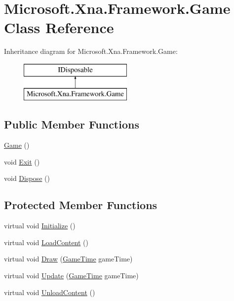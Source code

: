 \hypertarget{class_microsoft_1_1_xna_1_1_framework_1_1_game}{}\section{Microsoft.\+Xna.\+Framework.\+Game Class Reference}
\label{class_microsoft_1_1_xna_1_1_framework_1_1_game}
Inheritance diagram for Microsoft.\+Xna.\+Framework.\+Game\+:\begin{figure}[H]
\begin{center}
\leavevmode
\includegraphics[height=2.000000cm]{class_microsoft_1_1_xna_1_1_framework_1_1_game}
\end{center}
\end{figure}
\subsection*{Public Member Functions}
\begin{DoxyCompactItemize}
\item 
\hyperlink{class_microsoft_1_1_xna_1_1_framework_1_1_game_a52c69dd7373b2be177021a89b9841940}{Game} ()
\item 
void \hyperlink{class_microsoft_1_1_xna_1_1_framework_1_1_game_af17564b7040fa467ff351ccbc8bee31e}{Exit} ()
\item 
void \hyperlink{class_microsoft_1_1_xna_1_1_framework_1_1_game_a474d2052a07baa980d34e8979ec79acf}{Dispose} ()
\end{DoxyCompactItemize}
\subsection*{Protected Member Functions}
\begin{DoxyCompactItemize}
\item 
virtual void \hyperlink{class_microsoft_1_1_xna_1_1_framework_1_1_game_ae997daaeb487e2e1835e91f0c58f4834}{Initialize} ()
\item 
virtual void \hyperlink{class_microsoft_1_1_xna_1_1_framework_1_1_game_a56af53bc88aa2ec825463b8ac4eb9cc2}{Load\+Content} ()
\item 
virtual void \hyperlink{class_microsoft_1_1_xna_1_1_framework_1_1_game_ad3b8f6777b48c10b5ba488ebc765685d}{Draw} (\hyperlink{class_microsoft_1_1_xna_1_1_framework_1_1_game_time}{Game\+Time} game\+Time)
\item 
virtual void \hyperlink{class_microsoft_1_1_xna_1_1_framework_1_1_game_a0343977b965d488098029e67a108581e}{Update} (\hyperlink{class_microsoft_1_1_xna_1_1_framework_1_1_game_time}{Game\+Time} game\+Time)
\item 
virtual void \hyperlink{class_microsoft_1_1_xna_1_1_framework_1_1_game_ae9e886abdf2d333f0cebdb736b556e9b}{Unload\+Content} ()
\end{DoxyCompactItemize}
